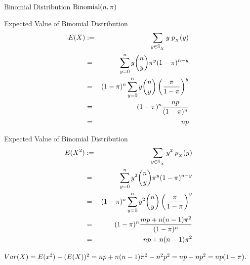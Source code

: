 \documentclass[compress]{beamer}
\begin{document}
\begin{frame}{Binomial Distribution $\text{Binomial}(n,\pi)$}
\vspace{.1in}


\end{frame}



\begin{frame}{Expected Value of Binomial Distribution}
\begin{eqnarray}
E(X)& := &  \sum_{y\in \support[X]} y\; \pmf_{_X}(y) \nonumber\\
& = &  \sum_{y=0}^{n} y {n\choose y}\binP^y(1-\binP)^{n-y}  \nonumber\\
& =& (1-\binP)^{n}  \sum_{y=0}^{n}  y {n\choose y}\left( \frac{\binP}{1-\binP}\right)^y   \nonumber\\
& =& (1-\binP)^{n}  \frac{np}{(1-\binP)^n} \nonumber\\
& =& np
\end{eqnarray}

\end{frame}


\begin{frame}{Expected Value of Binomial Distribution}
\begin{eqnarray}
E(X^2)& := &  \sum_{y\in \support[X]} y^2\; \pmf_{_X}(y) \nonumber\\
& = &  \sum_{y=0}^{n} y^2 {n\choose y}\binP^y(1-\binP)^{n-y}  \nonumber\\
& =& (1-\binP)^{n}  \sum_{y=0}^{n}  y^2 {n\choose y}\left( \frac{\binP}{1-\binP}\right)^y   \nonumber\\
& =& (1-\binP)^{n}  \frac{mp+ n(n-1)\binP^2}{(1-\binP)^n} \nonumber\\
& =& np+ n(n-1)\binP^2
\end{eqnarray}

$Var(X)= E(x^2)- (E(X))^2= np+n(n-1)\pi^2- n^2p^2= np-np^2= np(1-\pi). $

\end{frame}
\end{document}
